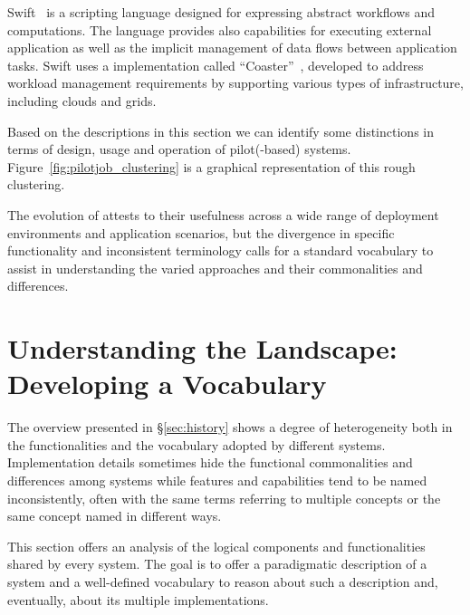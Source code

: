 \documentclass{sig-alternate}
\begin{document}
Swift~\cite{Wilde2011} is a scripting language designed for expressing abstract
workflows and computations. The language provides also capabilities for
executing external application as well as the implicit management of data flows
between application tasks. Swift uses a \pilot implementation called
``Coaster''~\cite{coasters}, developed to address workload management
requirements by supporting various types of infrastructure, including clouds
and grids.



Based on the descriptions in this section we can identify some distinctions in
terms of design, usage and operation of pilot(-based) systems.
Figure~\ref{fig:pilotjob_clustering} is a graphical representation of this
rough clustering.

The evolution of \pilotjobs attests to their usefulness across a wide range of
deployment environments and application scenarios, but the divergence in
specific functionality and inconsistent terminology calls for a standard
vocabulary to assist in understanding the varied approaches and their
commonalities and differences.



\section{Understanding the Landscape: Developing a Vocabulary}
\label{sec:understanding}

The overview presented in \S\ref{sec:history} shows a degree of
heterogeneity both in the functionalities and the vocabulary adopted by
different \pilot systems. Implementation details sometimes hide the
functional commonalities and differences among \pilot systems while
features and capabilities tend to be named inconsistently, often with
the same terms referring to multiple concepts or the same concept named
in different ways.

This section offers an analysis of the logical components and functionalities
shared by every \pilot system. The goal is to offer a paradigmatic description
of a \pilot system and a well-defined vocabulary to reason about such a
description and, eventually, about its multiple implementations.
\end{document}
